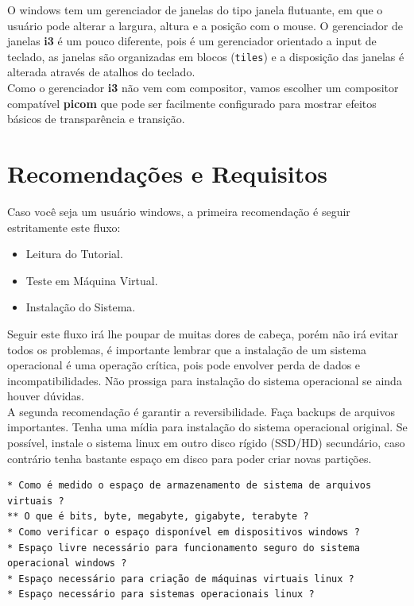 \documentclass[12pt,a4paper]{article}
\begin{document}
\vspace{\baselineskip}

O windows tem um gerenciador de janelas do tipo janela flutuante, em que o usuário pode alterar a largura, altura e a posição com o mouse. O gerenciador de janelas \textbf{i3} é um pouco diferente, pois é um gerenciador orientado a input de teclado, as janelas são organizadas em blocos (\texttt{tiles}) e a disposição das janelas é alterada através de atalhos do teclado.\\

Como o gerenciador \textbf{i3} não vem com compositor, vamos escolher um compositor compatível \textbf{picom} que pode ser facilmente configurado para mostrar efeitos básicos de transparência e transição. 

\section{Recomendações e Requisitos}

\hspace{\baselineskip}

Caso você seja um usuário windows, a primeira recomendação é seguir estritamente este fluxo:

\begin{itemize}
\item[1.] Leitura do Tutorial.
\item[2.] Teste em Máquina Virtual.
\item[3.] Instalação do Sistema.
\end{itemize}

Seguir este fluxo irá lhe poupar de muitas dores de cabeça, porém não irá evitar todos os problemas, é importante lembrar que a instalação de um sistema operacional é uma operação crítica, pois pode envolver perda de dados e incompatibilidades. Não prossiga para instalação do sistema operacional se ainda houver dúvidas. \\

A segunda recomendação é garantir a reversibilidade. Faça backups de arquivos importantes. Tenha uma mídia para instalação do sistema operacional original. Se possível, instale o sistema linux em outro disco rígido (SSD/HD) secundário, caso contrário tenha bastante espaço em disco para poder criar novas partições. \\

\begin{lstlisting}
* Como é medido o espaço de armazenamento de sistema de arquivos virtuais ?
** O que é bits, byte, megabyte, gigabyte, terabyte ?
* Como verificar o espaço disponível em dispositivos windows ?
* Espaço livre necessário para funcionamento seguro do sistema operacional windows ?
* Espaço necessário para criação de máquinas virtuais linux ?
* Espaço necessário para sistemas operacionais linux ? 
\end{lstlisting}
\end{document}
